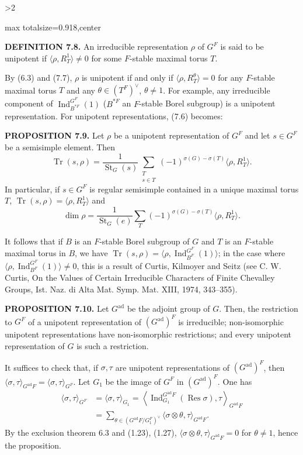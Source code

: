 \documentclass[9pt,twoside]{extarticle}
\newcommand{\EditionPage}[3]{%
  \ifnum#1>2\clearpage\fi
  \pdfbookmark[1]{Printed page #2}{en-folio-#2}%
  \hypertarget{en-physical-#1}{}%
  \noindent\begin{adjustbox}{max totalsize={\textwidth}{0.918\textheight},center}
  \begin{minipage}[t]{\textwidth}
  \fontsize{9.4}{11.1}\selectfont\justifying
  #3
  \end{minipage}
  \end{adjustbox}%
}
\begin{document}
\EditionPage{42}{143}{%
\noindent\textbf{DEFINITION 7.8.} An irreducible representation \(\rho\) of \(G^F\) is said to be unipotent if \(\langle\rho,R_T^1\rangle\ne0\) for some \(F\)-stable maximal torus \(T\).\par

By (6.3) and (7.7), \(\rho\) is unipotent if and only if \(\langle\rho,R_T^\theta\rangle=0\) for any \(F\)-stable maximal torus \(T\) and any \(\theta\in(T^F)^\vee\), \(\theta\ne1\). For example, any irreducible component of \(\operatorname{Ind}_{B^{*F}}^{G^F}(1)\) (\(B^{*F}\) an \(F\)-stable Borel subgroup) is a unipotent representation. For unipotent representations, (7.6) becomes:\par

\noindent\textbf{PROPOSITION 7.9.} Let \(\rho\) be a unipotent representation of \(G^F\) and let \(s\in G^F\) be a semisimple element. Then \[
\operatorname{Tr}(s,\rho)=
\frac1{\operatorname{St}_G(s)}
\sum_{\substack{T\\s\in T}}
(-1)^{\sigma(G)-\sigma(T)}\langle\rho,R_T^1\rangle.
\] In particular, if \(s\in G^F\) is regular semisimple contained in a unique maximal torus \(T\), \(\operatorname{Tr}(s,\rho)=\langle\rho,R_T^1\rangle\) and \[
\dim\rho=
\frac1{\operatorname{St}_G(e)}
\sum_T(-1)^{\sigma(G)-\sigma(T)}\langle\rho,R_T^1\rangle.
\]\par

It follows that if \(B\) is an \(F\)-stable Borel subgroup of \(G\) and \(T\) is an \(F\)-stable maximal torus in \(B\), we have \(\operatorname{Tr}(s,\rho)=\langle\rho,\operatorname{Ind}_{B^F}^{G^F}(1)\rangle\); in the case where \(\langle\rho,\operatorname{Ind}_{B^F}^{G^F}(1)\rangle\ne0\), this is a result of Curtis, Kilmoyer and Seitz (see C. W. Curtis, On the Values of Certain Irreducible Characters of Finite Chevalley Groups, Ist. Naz. di Alta Mat. Symp. Mat. XIII, 1974, 343--355).\par

\noindent\textbf{PROPOSITION 7.10.} Let \(G^{\mathrm{ad}}\) be the adjoint group of \(G\). Then, the restriction to \(G^F\) of a unipotent representation of \((G^{\mathrm{ad}})^F\) is irreducible; non-isomorphic unipotent representations have non-isomorphic restrictions; and every unipotent representation of \(G\) is such a restriction.\par

It suffices to check that, if \(\sigma,\tau\) are unipotent representations of \((G^{\mathrm{ad}})^F\), then \(\langle\sigma,\tau\rangle_{G^{\mathrm{ad}}F}=\langle\sigma,\tau\rangle_{G^F}\). Let \(G_1\) be the image of \(G^F\) in \((G^{\mathrm{ad}})^F\). One has \[
\begin{aligned}
\langle\sigma,\tau\rangle_{G^F}
&=\langle\sigma,\tau\rangle_{G_1}
=\left\langle\operatorname{Ind}_{G_1}^{G^{\mathrm{ad}}F}(\operatorname{Res}\sigma),\tau\right\rangle_{G^{\mathrm{ad}}F}\\
&=\sum_{\theta\in(G^{\mathrm{ad}}F/G_1^F)^\vee}
\langle\sigma\otimes\theta,\tau\rangle_{G^{\mathrm{ad}}F}.
\end{aligned}
\] By the exclusion theorem 6.3 and (1.23), (1.27), \(\langle\sigma\otimes\theta,\tau\rangle_{G^{\mathrm{ad}}F}=0\) for \(\theta\ne1\), hence the proposition.\par

}
\end{document}

